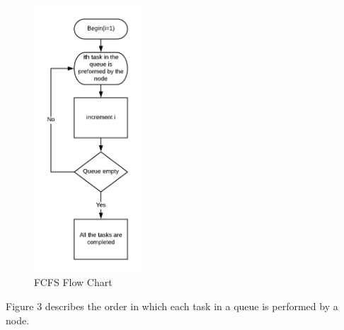 \documentclass[conference]{IEEEtran}
\begin{document}
\begin{figure}[H]
\includegraphics[width=4cm,center]{FCFS.png}
  \caption{FCFS Flow Chart}
  \label{fig:6}
\end{figure}

Figure 3 describes the order in which each task in a queue is performed by a node.\\
\end{document}
